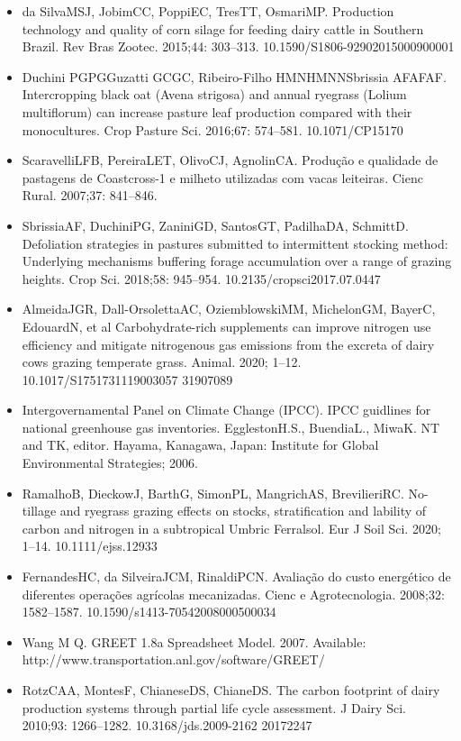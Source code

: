 \documentclass[11pt,a4paper]{article}
\begin{document}
\begin{itemize}
\item da SilvaMSJ, JobimCC, PoppiEC, TresTT, OsmariMP. Production technology and quality of corn silage for feeding dairy cattle in Southern Brazil. Rev Bras Zootec. 2015;44: 303–313. 10.1590/S1806-92902015000900001
\item Duchini PGPGGuzatti GCGC, Ribeiro-Filho HMNHMNNSbrissia AFAFAF. Intercropping black oat (Avena strigosa) and annual ryegrass (Lolium multiflorum) can increase pasture leaf production compared with their monocultures. Crop Pasture Sci. 2016;67: 574–581. 10.1071/CP15170
\item ScaravelliLFB, PereiraLET, OlivoCJ, AgnolinCA. Produção e qualidade de pastagens de Coastcross-1 e milheto utilizadas com vacas leiteiras. Cienc Rural. 2007;37: 841–846.
\item SbrissiaAF, DuchiniPG, ZaniniGD, SantosGT, PadilhaDA, SchmittD. Defoliation strategies in pastures submitted to intermittent stocking method: Underlying mechanisms buffering forage accumulation over a range of grazing heights. Crop Sci. 2018;58: 945–954. 10.2135/cropsci2017.07.0447
\item AlmeidaJGR, Dall-OrsolettaAC, OziemblowskiMM, MichelonGM, BayerC, EdouardN, et al Carbohydrate-rich supplements can improve nitrogen use efficiency and mitigate nitrogenous gas emissions from the excreta of dairy cows grazing temperate grass. Animal. 2020; 1–12. 10.1017/S1751731119003057 31907089
\item Intergovernamental Panel on Climate Change (IPCC). IPCC guidlines for national greenhouse gas inventories. EgglestonH.S., BuendiaL., MiwaK. NT and TK, editor. Hayama, Kanagawa, Japan: Institute for Global Environmental Strategies; 2006.
\item RamalhoB, DieckowJ, BarthG, SimonPL, MangrichAS, BrevilieriRC. No-tillage and ryegrass grazing effects on stocks, stratification and lability of carbon and nitrogen in a subtropical Umbric Ferralsol. Eur J Soil Sci. 2020; 1–14. 10.1111/ejss.12933
\item FernandesHC, da SilveiraJCM, RinaldiPCN. Avaliação do custo energético de diferentes operações agrícolas mecanizadas. Cienc e Agrotecnologia. 2008;32: 1582–1587. 10.1590/s1413-70542008000500034
\item Wang M Q. GREET 1.8a Spreadsheet Model. 2007. Available: http://www.transportation.anl.gov/software/GREET/
\item RotzCAA, MontesF, ChianeseDS, ChianeDS. The carbon footprint of dairy production systems through partial life cycle assessment. J Dairy Sci. 2010;93: 1266–1282. 10.3168/jds.2009-2162 20172247

\end{itemize}
\end{document}
